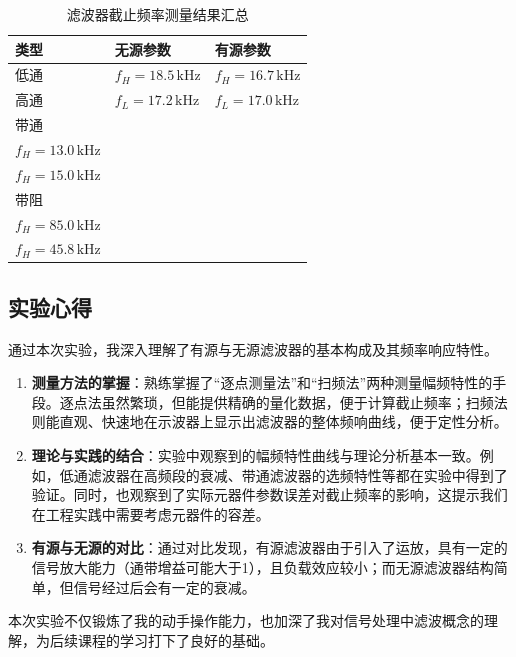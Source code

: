 \documentclass[12pt]{ctexart}
\begin{document}
\begin{table}[H]
    \centering
    \renewcommand{\arraystretch}{1.5}
    \setlength{\tabcolsep}{8pt}
    \begin{tabular}{|l|l|l|}
        \hline
        \textbf{类型} & \textbf{无源参数} & \textbf{有源参数} \\
        \hline
        低通 & $f_H = 18.5\,\mathrm{kHz}$ & $f_H = 16.7\,\mathrm{kHz}$ \\
        高通 & $f_L = 17.2\,\mathrm{kHz}$ & $f_L = 17.0\,\mathrm{kHz}$ \\
        \hline
        带通 & \makecell[l]{$f_L = 2.1\,\mathrm{kHz}$ \\ $f_H = 13.0\,\mathrm{kHz}$} &
               \makecell[l]{$f_L = 3.8\,\mathrm{kHz}$ \\ $f_H = 15.0\,\mathrm{kHz}$} \\
        \hline
        带阻 & \makecell[l]{$f_L = 3.6\,\mathrm{kHz}$ \\ $f_H = 85.0\,\mathrm{kHz}$} &
               \makecell[l]{$f_L = 6.5\,\mathrm{kHz}$ \\ $f_H = 45.8\,\mathrm{kHz}$} \\
        \hline
    \end{tabular}
    \caption{滤波器截止频率测量结果汇总}
    \label{tab:final_result}
\end{table}


\subsection{实验心得}

通过本次实验，我深入理解了有源与无源滤波器的基本构成及其频率响应特性。
\begin{enumerate}
    \item \textbf{测量方法的掌握}：熟练掌握了“逐点测量法”和“扫频法”两种测量幅频特性的手段。逐点法虽然繁琐，但能提供精确的量化数据，便于计算截止频率；扫频法则能直观、快速地在示波器上显示出滤波器的整体频响曲线，便于定性分析。
    \item \textbf{理论与实践的结合}：实验中观察到的幅频特性曲线与理论分析基本一致。例如，低通滤波器在高频段的衰减、带通滤波器的选频特性等都在实验中得到了验证。同时，也观察到了实际元器件参数误差对截止频率的影响，这提示我们在工程实践中需要考虑元器件的容差。
    \item \textbf{有源与无源的对比}：通过对比发现，有源滤波器由于引入了运放，具有一定的信号放大能力（通带增益可能大于1），且负载效应较小；而无源滤波器结构简单，但信号经过后会有一定的衰减。
\end{enumerate}

本次实验不仅锻炼了我的动手操作能力，也加深了我对信号处理中滤波概念的理解，为后续课程的学习打下了良好的基础。
\end{document}
